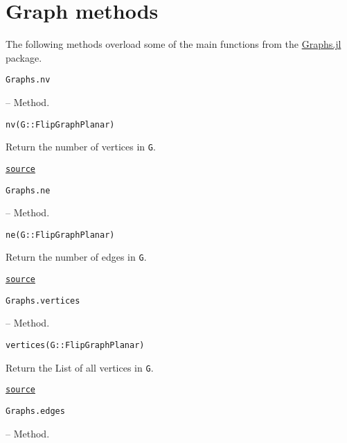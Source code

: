 \section{Graph methods}



\label{18181481596881829449}{}


The following methods overload some of the main functions from the \href{https://juliagraphs.org/Graphs.jl/stable/}{Graphs.jl} package.


\hypertarget{12642971583515548947}{\texttt{Graphs.nv}}  -- {Method.}

\begin{adjustwidth}{2em}{0pt}


\begin{verbatim}
nv(G::FlipGraphPlanar)
\end{verbatim}

Return the number of vertices in \texttt{G}.



\href{https://github.com/schto223/FlipGraphs.jl/blob/490c01a7adf74b42f27dda05099165c47ae8133e/src/flipGraphPlanar.jl#L83-L87}{\texttt{source}}


\end{adjustwidth}
\hypertarget{12070345305935665180}{\texttt{Graphs.ne}}  -- {Method.}

\begin{adjustwidth}{2em}{0pt}


\begin{verbatim}
ne(G::FlipGraphPlanar)
\end{verbatim}

Return the number of edges in \texttt{G}.



\href{https://github.com/schto223/FlipGraphs.jl/blob/490c01a7adf74b42f27dda05099165c47ae8133e/src/flipGraphPlanar.jl#L76-L80}{\texttt{source}}


\end{adjustwidth}
\hypertarget{11409300395072670495}{\texttt{Graphs.vertices}}  -- {Method.}

\begin{adjustwidth}{2em}{0pt}


\begin{verbatim}
vertices(G::FlipGraphPlanar)
\end{verbatim}

Return the List of all vertices in \texttt{G}.



\href{https://github.com/schto223/FlipGraphs.jl/blob/490c01a7adf74b42f27dda05099165c47ae8133e/src/flipGraphPlanar.jl#L90-L94}{\texttt{source}}


\end{adjustwidth}
\hypertarget{17434895256593567637}{\texttt{Graphs.edges}}  -- {Method.}

